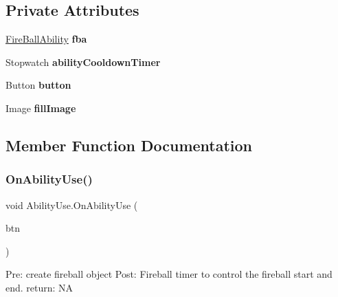 \subsection*{Private Attributes}
\begin{DoxyCompactItemize}
\item 
\mbox{\label{class_ability_use_a5f60416a07ffc31c4ac3b312c3f0dae5}} 
\hyperlink{class_fire_ball_ability}{Fire\+Ball\+Ability} {\bfseries fba}
\item 
\mbox{\label{class_ability_use_a6d34078450131b90ff5268a2c99811cd}} 
Stopwatch {\bfseries ability\+Cooldown\+Timer}
\item 
\mbox{\label{class_ability_use_ac1f8667346ef2b6adeb0ed3c171d1db3}} 
Button {\bfseries button}
\item 
\mbox{\label{class_ability_use_a10d8ce7137662348ee0c609c78546fb6}} 
Image {\bfseries fill\+Image}
\end{DoxyCompactItemize}


\subsection{Member Function Documentation}
\mbox{\label{class_ability_use_a5dcf922cb131580a2ba04d6c39d057e8}} 
\subsubsection{\texorpdfstring{On\+Ability\+Use()}{OnAbilityUse()}}
{\footnotesize\ttfamily void Ability\+Use.\+On\+Ability\+Use (\begin{DoxyParamCaption}\item[{Game\+Object}]{btn }\end{DoxyParamCaption})}

Pre\+: create fireball object Post\+: Fireball timer to control the fireball start and end. return\+: NA \mbox{\label{class_ability_use_a59af761fa480e127524d0948dda9bd80}} 
